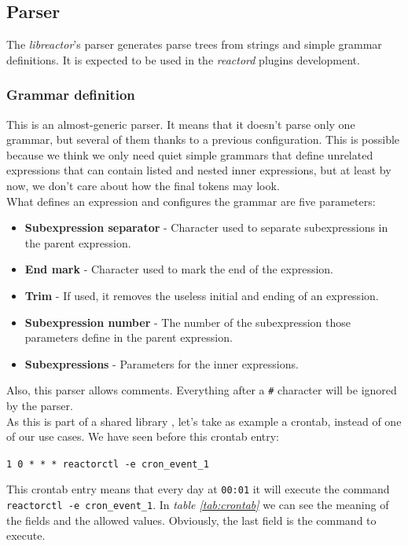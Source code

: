 \subsection{Parser}
\label{sec:parser}
The \emph{libreactor}'s parser generates parse trees from strings and simple grammar definitions. It is expected to be used in the 
\emph{reactord} plugins development.
\subsubsection{Grammar definition}
This is an almost-generic parser. It means that it doesn't parse only one grammar, but several of them thanks to a previous 
configuration. This is possible because we think we only need quiet simple grammars that define unrelated expressions that can contain
listed and nested inner expressions, but at least by now, we don't care about how the final tokens may look.\\
What defines an expression and configures the grammar are five parameters:
\begin{itemize}
  \item {\bf Subexpression separator} - Character used to separate subexpressions in the parent expression.
  \item {\bf End mark} - Character used to mark the end of the expression.
  \item {\bf Trim} - If used, it removes the useless initial and ending of an expression.
  \item {\bf Subexpression number} - The number of the subexpression those parameters define in the parent expression.
  \item {\bf Subexpressions} - Parameters for the inner expressions.
\end{itemize}
Also, this parser allows comments. Everything after a \texttt{\#} character will be ignored by the parser.\\
As this is part of a shared library , let's take as example a crontab, instead of one of our use cases. We have seen before this 
crontab entry:
\begin{center}
  \texttt{1 0 {*} {*} {*}  reactorctl -e cron\_event\_1}\\
\end{center}
This crontab entry means that every day at \texttt{00:01} it will execute the command \texttt{reactorctl -e cron\_event\_1}. In 
\emph{table \ref{tab:crontab}} we can see the meaning of the fields and the allowed values. Obviously, the last field is the command to
execute.
